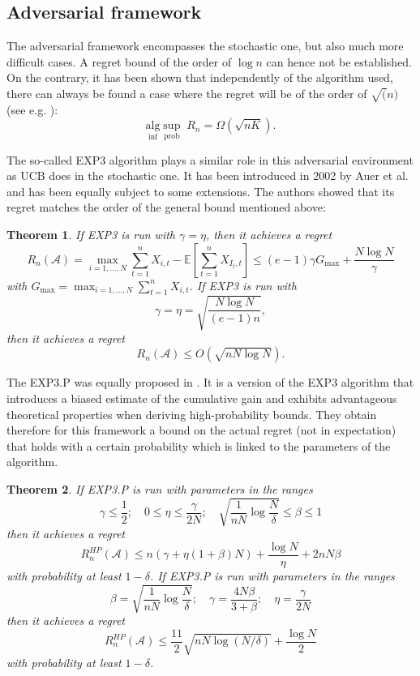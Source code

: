 \documentclass[10.5pt]{article}
\newtheorem{theorem}{Theorem}
\begin{document}
\subsection*{Adversarial framework}

The adversarial framework encompasses the stochastic one, but also much more difficult cases. A regret bound of the order of $\log n$ can hence not be established. On the contrary, it has been shown that independently of the algorithm used, there can always be found a case where the regret will be of the order of $\sqrt(n)$ (see e.g. \cite{Cesa06}):
$$\underset{\inf}{\text{alg}} \sup_{\text{prob}} \; R_n = \Omega(\sqrt{nK}).$$

The so-called EXP3 algorithm plays a similar role in this adversarial environment as UCB does in the stochastic one. It has been introduced in 2002 by Auer et al. \cite{Auer02b} and has been equally subject to some extensions. The authors showed that its regret matches the order of the general bound mentioned above:
\begin{theorem}
If EXP3 is run with $\gamma = \eta$, then it achieves a regret
$$ R_n(\mathcal{A}) = \max_{i = 1,...,N} \sum_{t=1}^n X_{i,t} - \mathbb{E} \left [ \sum_{t=1}^n X_{I_t,t}\right]
\leq (e-1)\gamma G_{\text{max}} + \frac{N \log N}{\gamma}$$
with $G_{\text{max}} = \max_{i = 1,...,N} \sum_{t=1}^n X_{i,t}$. If EXP3 is run with 
$$ \gamma = \eta = \sqrt{\frac{N \log N}{(e-1)n}}, $$
then it achieves a regret
$$ R_n(\mathcal{A}) \leq O(\sqrt{n N \log N}).$$
\end{theorem}

The EXP3.P was equally proposed in \cite{Auer02b}. It is a version of the EXP3 algorithm that introduces a biased estimate of the cumulative gain and exhibits advantageous theoretical properties when deriving high-probability bounds. They obtain therefore for this framework a bound on the actual regret (not in expectation) that holds with a certain probability which is linked to the parameters of the algorithm.
\begin{theorem}
If EXP3.P is run with parameters in the ranges
$$\gamma \leq \frac{1}{2}; \quad 0 \leq \eta \leq \frac{\gamma}{2N}; \quad \sqrt{\frac{1}{nN}\log \frac{N}{\delta}} \leq \beta \leq 1 $$
then it achieves a regret 
$$R_n^{HP}(\mathcal{A}) \leq n(\gamma + \eta(1+\beta)N) + \frac{\log N}{\eta} + 2nN\beta $$
with probability at least $ 1 - \delta$.
If EXP3.P is run with parameters in the ranges
$$ \beta = \sqrt{\frac{1}{nN}\log \frac{N}{\delta}}; \quad \gamma = \frac{4N\beta}{3 + \beta}; \quad \eta = \frac{\gamma}{2N} $$
then it achieves a regret
$$ R_n^{HP} (\mathcal{A}) \leq \frac{11}{2} \sqrt{nN \log (N/\delta)} + \frac{\log N}{2}$$
with probability at least $1 - \delta$. 
\end{theorem}
\end{document}
